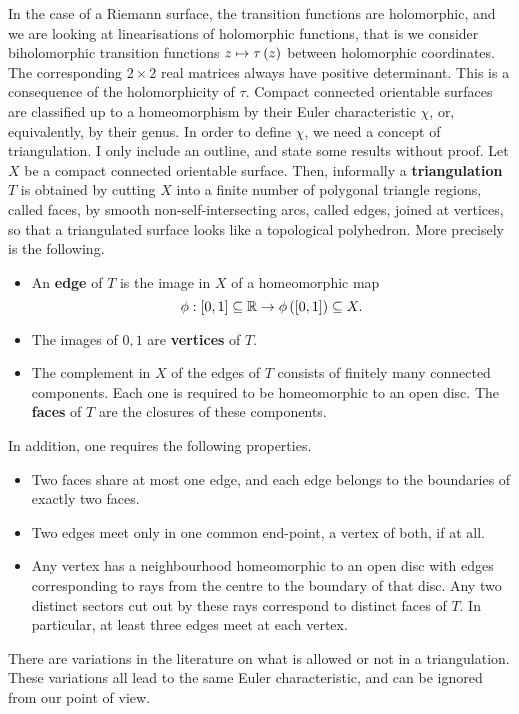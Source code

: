 In the case of a Riemann surface, the transition functions are holomorphic, and we are looking at linearisations of holomorphic functions, that is we consider biholomorphic transition functions $ z \mapsto \tau\left( z \right) $ between holomorphic coordinates. The corresponding $ 2 \times 2 $ real matrices always have positive determinant. This is a consequence of the holomorphicity of $ \tau $. Compact connected orientable surfaces are classified up to a homeomorphism by their Euler characteristic $ \chi $, or, equivalently, by their genus. In order to define $ \chi $, we need a concept of triangulation. I only include an outline, and state some results without proof. Let $ X $ be a compact connected orientable surface. Then, informally a \textbf{triangulation} $ T $ is obtained by cutting $ X $ into a finite number of polygonal triangle regions, called faces, by smooth non-self-intersecting arcs, called edges, joined at vertices, so that a triangulated surface looks like a topological polyhedron. More precisely is the following.
\begin{itemize}
\item An \textbf{edge} of $ T $ is the image in $ X $ of a homeomorphic map
$$ \phi : \left[ 0, 1 \right] \subseteq \mathbb{R} \to \phi\left( \left[ 0, 1 \right] \right) \subseteq X. $$
\item The images of $ 0, 1 $ are \textbf{vertices} of $ T $.
\item The complement in $ X $ of the edges of $ T $ consists of finitely many connected components. Each one is required to be homeomorphic to an open disc. The \textbf{faces} of $ T $ are the closures of these components.
\end{itemize}
In addition, one requires the following properties.
\begin{itemize}
\item Two faces share at most one edge, and each edge belongs to the boundaries of exactly two faces.
\item Two edges meet only in one common end-point, a vertex of both, if at all.
\item Any vertex has a neighbourhood homeomorphic to an open disc with edges corresponding to rays from the centre to the boundary of that disc. Any two distinct sectors cut out by these rays correspond to distinct faces of $ T $. In particular, at least three edges meet at each vertex.
\end{itemize}

\pagebreak

\begin{remark}
There are variations in the literature on what is allowed or not in a triangulation. These variations all lead to the same Euler characteristic, and can be ignored from our point of view.
\end{remark}

